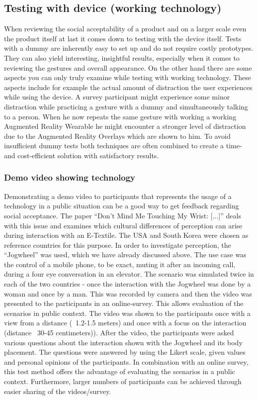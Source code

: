 \documentclass{sigchi}
\begin{document}
\subsection{Testing with device (working technology)}
When reviewing the social acceptability of a product and on a larger scale even the product itself at last it comes down to testing with the device itself. Tests with a dummy are inherently easy to set up and do not require costly prototypes. They can also yield interesting, insightful results, especially when it comes to reviewing the gestures and overall appearance. On the other hand there are some aspects you can only truly examine while testing with working technology. These aspects include for example the actual amount of distraction the user experiences while using the device. A survey participant might experience some minor distraction while practicing a gesture with a dummy and simultaneously talking to a person. When he now repeats the same gesture with working a working Augmented Reality Wearable he might encounter a stronger level of distraction due to the Augmented Reality Overlays which are shown to him.
To avoid insufficient dummy tests both techniques are often combined to create a time- and cost-efficient solution with satisfactory results.

\subsubsection{Demo video showing technology}
Demonstrating a demo video to participants that represents the usage of a technology in a public situation can be a good way to get feedback regarding social acceptance. The paper ``Don't Mind Me Touching My Wrist: [...]''\cite{touch-wrist} deals with this issue and examines which cultural differences of perception can arise during interaction with an E-Textile. \cite{touch-wrist} The USA and South Korea were chosen as reference countries for this purpose. In order to investigate perception, the ``Jogwheel'' was used, which we have already discussed above. The use case was the control of a mobile phone, to be exact, muting it after an incoming call, during a four eye conversation in an elevator. The scenario was simulated twice in each of the two countries - once the interaction with the Jogwheel was done by a woman and once by a man. This was recorded by camera and then the video was presented to the participants in an online-survey. This allows evaluation of the scenarios in public context. The video was shown to the participants once with a view from a distance (~1.2-1.5 meters) and once with a focus on the interaction (distance ~30-45 centimeters)). After the video, the participants were asked various questions about the interaction shown with the Jogwheel and its body placement. The questions were answered by using the Likert scale, given values and personal opinions of the participants. \cite{touch-wrist} In combination with an online survey, this test method offers the advantage of evaluating the scenarios in a public context. Furthermore, larger numbers of participants can be achieved through easier sharing of the videos/survey. \cite{touch-wrist}
\end{document}

